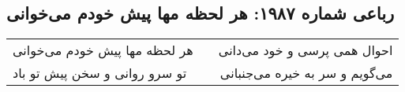 \begin{center}
\section*{رباعی شماره ۱۹۸۷: هر لحظه مها پیش خودم می‌خوانی}
\label{sec:1987}
\begin{longtable}{l p{0.5cm} r}
هر لحظه مها پیش خودم می‌خوانی
&&
احوال همی پرسی و خود می‌دانی
\\
تو سرو روانی و سخن پیش تو باد
&&
می‌گویم و سر به خیره می‌جنبانی
\\
\end{longtable}
\end{center}
